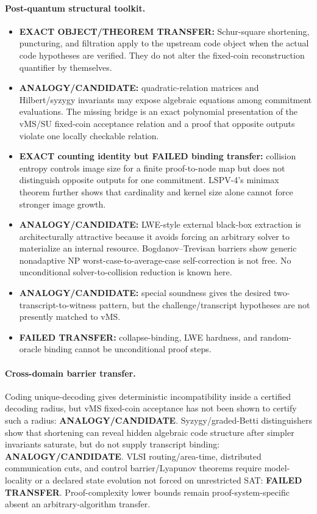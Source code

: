 \documentclass[11pt]{article}
\begin{document}
\paragraph{Post-quantum structural toolkit.}
\begin{itemize}
\item[] \textbf{EXACT OBJECT/THEOREM TRANSFER:} Schur-square shortening, puncturing, and filtration apply to the upstream code object when the actual code hypotheses are verified. They do not alter the fixed-coin reconstruction quantifier by themselves.
\item[] \textbf{ANALOGY/CANDIDATE:} quadratic-relation matrices and Hilbert/syzygy invariants may expose algebraic equations among commitment evaluations. The missing bridge is an exact polynomial presentation of the vMS/SU fixed-coin acceptance relation and a proof that opposite outputs violate one locally checkable relation.
\item[] \textbf{EXACT counting identity but FAILED binding transfer:} collision entropy controls image size for a finite proof-to-node map but does not distinguish opposite outputs for one commitment. LSPV-4's minimax theorem further shows that cardinality and kernel size alone cannot force stronger image growth.
\item[] \textbf{ANALOGY/CANDIDATE:} LWE-style external black-box extraction is architecturally attractive because it avoids forcing an arbitrary solver to materialize an internal resource. Bogdanov--Trevisan barriers show generic nonadaptive NP worst-case-to-average-case self-correction is not free. No unconditional solver-to-collision reduction is known here.
\item[] \textbf{ANALOGY/CANDIDATE:} special soundness gives the desired two-transcript-to-witness pattern, but the challenge/transcript hypotheses are not presently matched to vMS.
\item[] \textbf{FAILED TRANSFER:} collapse-binding, LWE hardness, and random-oracle binding cannot be unconditional proof steps.
\end{itemize}

\paragraph{Cross-domain barrier transfer.}
Coding unique-decoding gives deterministic incompatibility inside a certified decoding radius, but vMS fixed-coin acceptance has not been shown to certify such a radius: \textbf{ANALOGY/CANDIDATE}. Syzygy/graded-Betti distinguishers show that shortening can reveal hidden algebraic code structure after simpler invariants saturate, but do not supply transcript binding: \textbf{ANALOGY/CANDIDATE}. VLSI routing/area-time, distributed communication cuts, and control barrier/Lyapunov theorems require model-locality or a declared state evolution not forced on unrestricted SAT: \textbf{FAILED TRANSFER}. Proof-complexity lower bounds remain proof-system-specific absent an arbitrary-algorithm transfer.
\end{document}
